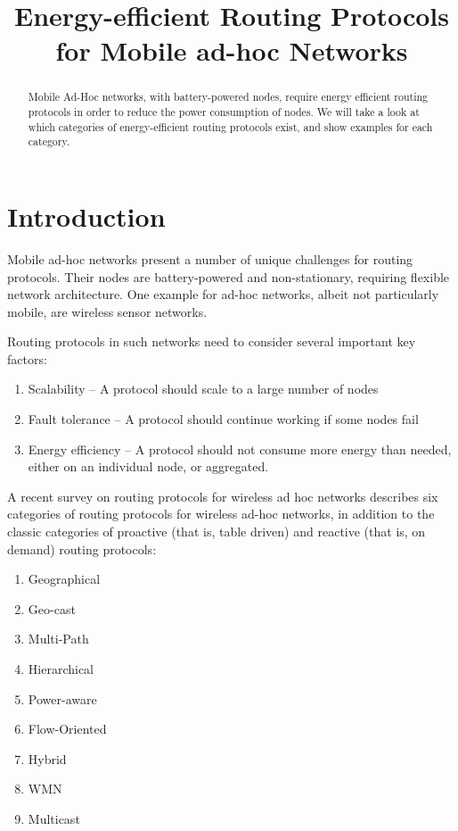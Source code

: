 \documentclass[conference]{IEEEtran}
\begin{document}
\title{Energy-efficient Routing Protocols for Mobile ad-hoc Networks}
\author{
}

\maketitle


\begin{abstract}
Mobile Ad-Hoc networks, with battery-powered nodes, require energy efficient
routing protocols in order to reduce the power consumption of nodes. We will
take a look at which categories of energy-efficient routing protocols exist,
and show examples for each category.
\end{abstract}


\section{Introduction}
Mobile ad-hoc networks present a number of unique challenges for routing protocols.
Their nodes are battery-powered and non-stationary, requiring flexible network architecture.
One example for ad-hoc networks, albeit not particularly mobile, are wireless sensor networks.

Routing protocols in such networks need to consider several important key
factors:
\begin{enumerate}
   \item Scalability -- A protocol should scale to a large number of nodes
   \item Fault tolerance -- A protocol should continue working if some nodes fail
   \item Energy efficiency -- A protocol should not consume more energy than needed,
   either on an individual node, or aggregated.
\end{enumerate}

A recent survey\cite{alotaibi2012survey} on routing protocols for wireless
ad hoc networks describes six categories of routing protocols for wireless
ad-hoc networks,  in addition to the classic categories of proactive (that is, table driven)
and reactive (that is, on demand) routing protocols:
\begin{enumerate}
  \item Geographical
  \item Geo-cast
  \item Multi-Path
  \item Hierarchical
  \item Power-aware
  \item Flow-Oriented
  \item Hybrid
  \item WMN
  \item Multicast
\end{enumerate}
\end{document}

